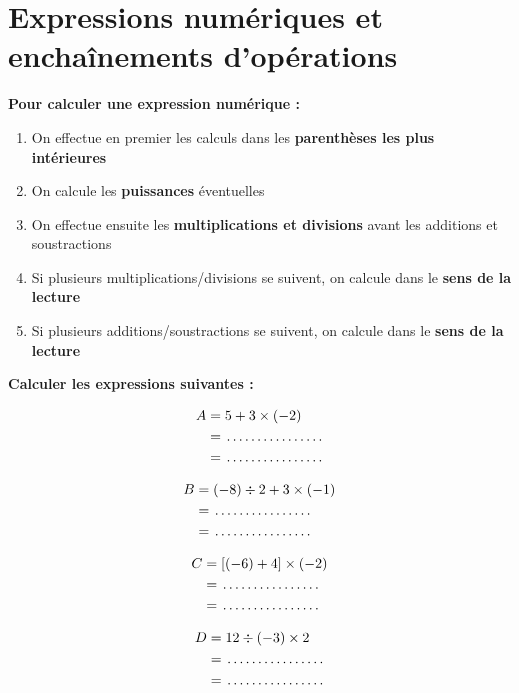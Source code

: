 \section{Expressions numériques et enchaînements d'opérations}
\begin{methodebox}
\textbf{Pour calculer une expression numérique :}
\begin{enumerate}[label = \arabic*)]
\item On effectue en premier les calculs dans les \textbf{parenthèses les plus intérieures}
\item On calcule les \textbf{puissances} éventuelles
\item On effectue ensuite les \textbf{multiplications et divisions} avant les additions et soustractions
\item Si plusieurs multiplications/divisions se suivent, on calcule dans le \textbf{sens de la lecture}
\item Si plusieurs additions/soustractions se suivent, on calcule dans le \textbf{sens de la lecture}
\end{enumerate}
\end{methodebox}

\begin{examplebox}
\textbf{Calculer les expressions suivantes :}

\noindent
\begin{minipage}[t]{0.48\textwidth}
\begin{align*}
A &= 5 + 3 \times (-2) \\
  &= \trous{2.5cm} \\
  &= \trous{2.5cm}
\end{align*}
\end{minipage}
\hfill
\begin{minipage}[t]{0.48\textwidth}
\begin{align*}
B &= (-8) \div 2 + 3 \times (-1) \\
  &= \trous{2.5cm} \\
  &= \trous{2.5cm}
\end{align*}
\end{minipage}

\vspace{1em}

\noindent
\begin{minipage}[t]{0.48\textwidth}
\begin{align*}
C &= [(-6) + 4] \times (-2) \\
  &= \trous{2.5cm} \\
  &= \trous{2.5cm}
\end{align*}
\end{minipage}
\hfill
\begin{minipage}[t]{0.48\textwidth}
\begin{align*}
D &= 12 \div (-3) \times 2 \\
  &= \trous{2.5cm} \\
  &= \trous{2.5cm}
\end{align*}
\end{minipage}
\end{examplebox}

